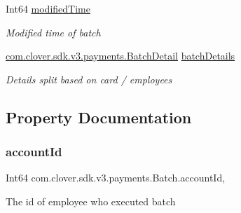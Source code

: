 \begin{DoxyCompactItemize}
Int64 \hyperlink{classcom_1_1clover_1_1sdk_1_1v3_1_1payments_1_1_batch_a811026e93daa11d7e31b6902b339decf}{modified\+Time}
\begin{DoxyCompactList}\small\item\em Modified time of batch \end{DoxyCompactList}\item 
\hyperlink{classcom_1_1clover_1_1sdk_1_1v3_1_1payments_1_1_batch_detail}{com.\+clover.\+sdk.\+v3.\+payments.\+Batch\+Detail} \hyperlink{classcom_1_1clover_1_1sdk_1_1v3_1_1payments_1_1_batch_a8aba80ba38915a628d8ff572102a76f2}{batch\+Details}
\begin{DoxyCompactList}\small\item\em Details split based on card / employees \end{DoxyCompactList}\end{DoxyCompactItemize}


\subsection{Property Documentation}
\mbox{\label{classcom_1_1clover_1_1sdk_1_1v3_1_1payments_1_1_batch_a1b04e1c45cbaaf0f0018645c91f1d6db}} 
\subsubsection{\texorpdfstring{account\+Id}{accountId}}
{\footnotesize\ttfamily Int64 com.\+clover.\+sdk.\+v3.\+payments.\+Batch.\+account\+Id\hspace{0.3cm}{\ttfamily [get]}, {\ttfamily [set]}}



The id of employee who executed batch 

\mbox{\label{classcom_1_1clover_1_1sdk_1_1v3_1_1payments_1_1_batch_a8aba80ba38915a628d8ff572102a76f2}} 
